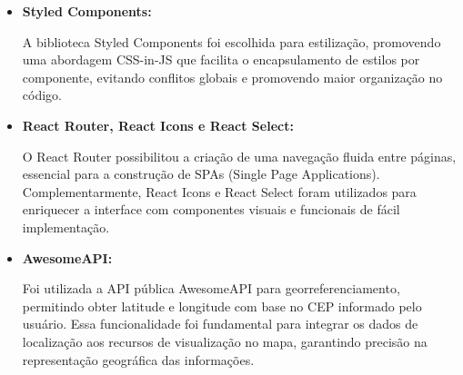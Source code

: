 \documentclass[12pt,a4paper]{report}
\begin{document}
\begin{itemize}
\item \textbf{Styled Components: }

A biblioteca Styled Components foi escolhida para estilização, promovendo uma abordagem CSS-in-JS que facilita o encapsulamento de estilos por componente, evitando conflitos globais e promovendo maior organização no código.

\item \textbf{React Router, React Icons e React Select: }

O React Router possibilitou a criação de uma navegação fluida entre páginas, essencial para a construção de SPAs (Single Page Applications). Complementarmente, React Icons e React Select foram utilizados para enriquecer a interface com componentes visuais e funcionais de fácil implementação.

\item \textbf{AwesomeAPI: }

Foi utilizada a API pública AwesomeAPI para georreferenciamento, permitindo obter latitude e longitude com base no CEP informado pelo usuário. Essa funcionalidade foi fundamental para integrar os dados de localização aos recursos de visualização no mapa, garantindo precisão na representação geográfica das informações.

\end{itemize}
\end{document}
